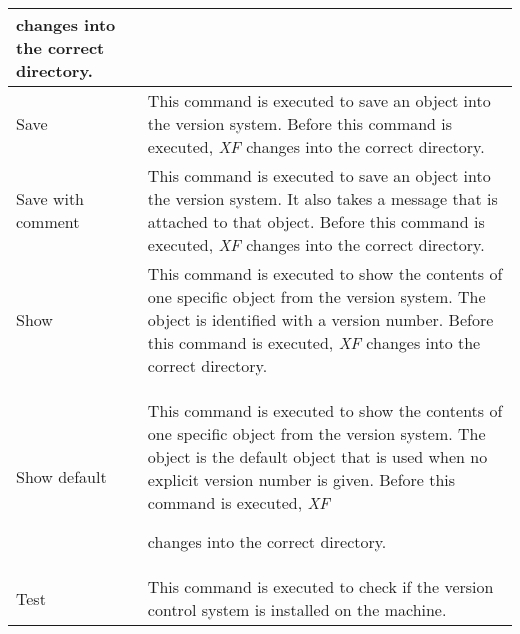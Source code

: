 {\begin{supertabular}{|l|p{7.5cm}|}
                          changes into the correct
                          directory.\\  \hline
Save                    & This command is executed to
                          save an object into the version
                          system. Before this command is
                          executed, {\em XF }
 changes into the
                          correct directory.\\  \hline
Save with comment       & This command is executed to
                          save an object into the version
                          system. It also takes a message
                          that is attached to that object.
                          Before this command is executed,
                          {\em XF }
 changes into the correct
                          directory.\\  \hline
Show                    & This command is executed to
                          show the contents of one specific
                          object from the version system.
                          The object is identified with a
                          version number. Before this
                          command is executed, {\em XF }
 changes
                          into the correct directory.\\  \hline
Show default            & This command is executed to
                          show the contents of one specific
                          object from the version system.
                          The object is the default object
                          that is used when no explicit
                          version number is given. Before
                          this command is executed, {\em XF }

                          changes into the correct
                          directory.\\  \hline
Test                    & This command is executed to
                          check if the version control
                          system is installed on the
                          machine.\\
\end{supertabular}
}

{\newpage
\clearpage
\samepage \begin{figure}[hbt]
  \centerline{
  \epsfysize=9cm
  }

  \label{fig:The procedure XFProcOptionsWindow}
\end{figure}
}

